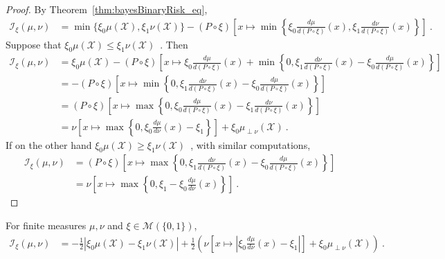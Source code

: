 \begin{proof}%
{}
By Theorem~\ref{thm:bayesBinaryRisk_eq},
\begin{align*}
\mathcal I_\xi(\mu, \nu)
&= \min\{\xi_0\mu(\mathcal X), \xi_1\nu(\mathcal X)\} - (P \circ \xi)\left[x \mapsto \min \left\{\xi_0\frac{d \mu}{d(P \circ \xi)}(x), \xi_1\frac{d \nu}{d(P \circ \xi)}(x)\right\}\right]
\: .
\end{align*}
Suppose that $\xi_0\mu(\mathcal X) \le \xi_1\nu(\mathcal X)$~. Then
\begin{align*}
\mathcal I_\xi(\mu, \nu)
&= \xi_0\mu(\mathcal X) - (P \circ \xi)\left[x \mapsto \xi_0\frac{d \mu}{d(P \circ \xi)}(x) + \min \left\{0 , \xi_1\frac{d \nu}{d(P \circ \xi)}(x) - \xi_0\frac{d \mu}{d(P \circ \xi)}(x)\right\}\right]
\\
&= - (P \circ \xi)\left[x \mapsto \min \left\{0 , \xi_1\frac{d \nu}{d(P \circ \xi)}(x) - \xi_0\frac{d \mu}{d(P \circ \xi)}(x) \right\}\right]
\\
&= (P \circ \xi)\left[x \mapsto \max \left\{0 , \xi_0\frac{d \mu}{d(P \circ \xi)}(x) - \xi_1\frac{d \nu}{d(P \circ \xi)}(x) \right\}\right]
\\
&= \nu\left[ x \mapsto \max \left\{0 , \xi_0\frac{d \mu}{d\nu}(x) - \xi_1 \right\} \right] + \xi_0 \mu_{\perp \nu}(\mathcal X)
\: .
\end{align*}
If on the other hand $\xi_0\mu(\mathcal X) \ge \xi_1\nu(\mathcal X)$~, with similar computations,
\begin{align*}
\mathcal I_\xi(\mu, \nu)
&= (P \circ \xi)\left[x \mapsto \max \left\{0 , \xi_1\frac{d \nu}{d(P \circ \xi)}(x) - \xi_0\frac{d \mu}{d(P \circ \xi)}(x) \right\}\right]
\\
&= \nu\left[ x \mapsto \max \left\{0 , \xi_1 - \xi_0\frac{d \mu}{d\nu}(x) \right\} \right]
\: .
\end{align*}
\end{proof}

\begin{corollary}
  \label{cor:statInfo_eq_integral_abs}
  For finite measures $\mu, \nu$ and $\xi \in \mathcal M(\{0,1\})$,
  \begin{align*}
  \mathcal I_\xi(\mu, \nu)
  &= -\frac{1}{2} \left\vert\xi_0 \mu(\mathcal X) - \xi_1 \nu(\mathcal X)\right\vert + \frac{1}{2}\left( \nu\left[ x \mapsto \left\vert\xi_0\frac{d \mu}{d\nu}(x) - \xi_1 \right\vert \right]  + \xi_0 \mu_{\perp \nu}(\mathcal X)\right)
  \: .
  \end{align*}
\end{corollary}


